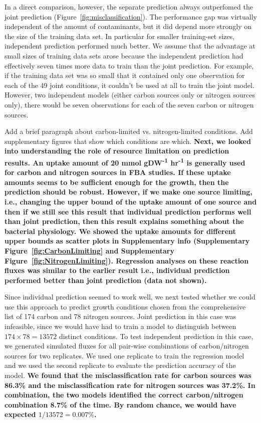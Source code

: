\documentclass[12pt]{article}
\begin{document}
In a direct comparison, however, the separate prediction always outperfomed the joint prediction (Figure~\ref{fig:misclassification}). The performance gap was virtually independent of the amount of contaminants, but it did depend more strongly on the size of the training data set. In particular for smaller training-set sizes, independent prediction performed much better. We assume that the advantage at small sizes of training data sets arose because the independent prediction had effectively seven times more data to train than the joint prediction. For example, if the training data set was so small that it contained only one observation for each of the 49 joint conditions, it couldn't be used at all to train the joint model. However, two independent models (either carbon sources only or nitrogen sources only), there would be seven observations for each of the seven carbon or nitrogen sources.

{\color{red}Add a brief paragraph about carbon-limited vs. nitrogen-limited conditions. Add supplementary figures that show which conditions are which.}
\textbf{Next, we looked into understanding the role of resource limitation on prediction results. An uptake amount of 20 mmol gDW\textsuperscript{-1} hr\textsuperscript{-1} is generally used for carbon and nitrogen sources in FBA studies. If these uptake amounts seems to be sufficient enough for the growth, then the prediction should be robust. However, if we make one source limiting, i.e., changing the upper bound of the uptake amount of one source and then if we still see this result that individual prediction performs well than joint prediction, then this result explains something about the bacterial physiology. We showed the uptake amounts for different upper bounds as scatter plots in Supplementary info (Supplementary Figure~\ref{fig:CarbonLimiting} and Supplementary Figure~\ref{fig:NitrogenLimiting}). Regression analyses on these reaction fluxes was similar to the earlier result i.e., individual prediction performed better than joint prediction (data not shown).}

Since individual prediction seemed to work well, we next tested whether we could use this approach to predict growth conditions chosen from the comprehensive list of 174 carbon and 78 nitrogen sources. Joint prediction in this case was infeasible, since we would have had to train a model to distinguish between $174\times78=13572$ distinct conditions. To test independent prediction in this case, we generated simulated fluxes for all pair-wise combinations of carbon/nitrogen sources for two replicates. We used one replicate to train the regression model and we used the second replicate to evaluate the prediction accuracy of the model. \textbf{We found that the misclassification rate for carbon sources was 86.3\% and the misclassification rate for nitrogen sources was 37.2\%. In combination, the two models identified the correct carbon/nitrogen combination 8.7\% of the time. By random chance, we would have expected $1/13572=0.007\%$.}
\end{document}
